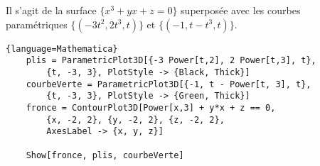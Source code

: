 \documentclass[a4paper]{article}
\begin{document}
Il s'agit de la surface $\{x^3+yx+z=0\}$ superposée avec les courbes paramétriques $\{(-3t^2,2t^3,t)\}$ et $\{(-1,t-t^3,t)\}$.

\begin{lstlisting}{language=Mathematica}
    plis = ParametricPlot3D[{-3 Power[t,2], 2 Power[t,3], t},
        {t, -3, 3}, PlotStyle -> {Black, Thick}]
    courbeVerte = ParametricPlot3D[{-1, t - Power[t, 3], t},
        {t, -3, 3}, PlotStyle -> {Green, Thick}]
    fronce = ContourPlot3D[Power[x,3] + y*x + z == 0,
        {x, -2, 2}, {y, -2, 2}, {z, -2, 2},
        AxesLabel -> {x, y, z}]

    Show[fronce, plis, courbeVerte]
\end{lstlisting}
\end{document}
